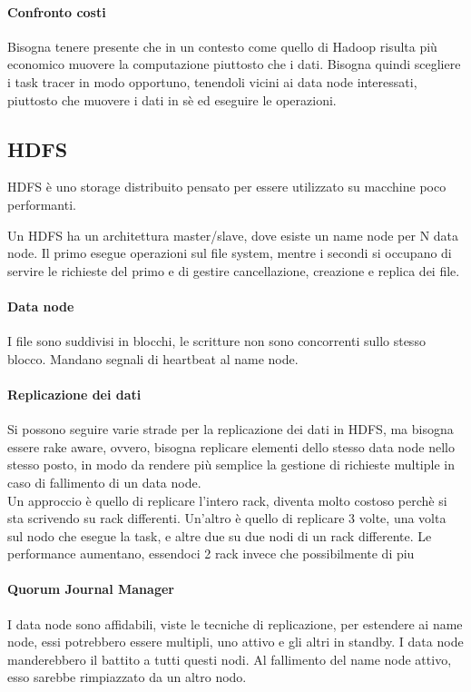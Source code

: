 \paragraph{Confronto costi}
Bisogna tenere presente che in un contesto come quello di Hadoop risulta 
più economico muovere la computazione piuttosto che i dati.
Bisogna quindi scegliere i task tracer in modo opportuno, tenendoli vicini ai 
data node interessati, piuttosto che muovere i dati in sè ed eseguire le operazioni.

\subsection{HDFS}
HDFS è uno storage distribuito pensato per essere utilizzato su macchine poco
performanti.

Un HDFS ha un architettura master/slave, dove esiste un name node per N data node.
Il primo esegue operazioni sul file system, mentre i secondi si occupano di 
servire le richieste del primo e di gestire cancellazione, creazione e replica dei 
file.

\paragraph{Data node}
I file sono suddivisi in blocchi, le scritture non sono concorrenti sullo stesso 
blocco. Mandano segnali di heartbeat al name node.

\paragraph{Replicazione dei dati}
Si possono seguire varie strade per la replicazione dei dati in HDFS, ma bisogna 
essere rake aware, ovvero, bisogna replicare elementi dello stesso data node nello
stesso posto, in modo da rendere più semplice la gestione di richieste multiple
in caso di fallimento di un data node.\\
Un approccio è quello di replicare l'intero rack, diventa molto costoso 
perchè si sta scrivendo su rack differenti. Un'altro è quello di replicare 3 
volte, una volta sul nodo che esegue la task, e altre due su due nodi di un rack 
differente. Le performance aumentano, essendoci 2 rack invece che possibilmente
di piu 

\paragraph{Quorum Journal Manager}
I data node sono affidabili, viste le tecniche di replicazione, per estendere
ai name node, essi potrebbero essere multipli, uno attivo e gli altri in standby.
I data node manderebbero il battito a tutti questi nodi. Al fallimento del name node 
attivo, esso sarebbe rimpiazzato da un altro nodo.

